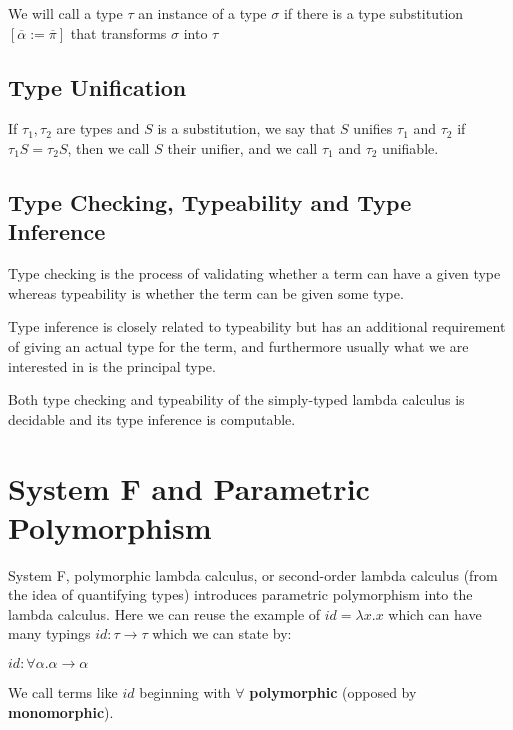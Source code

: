 We will call a type $\tau$ an instance of a type $\sigma$ if there is a type substitution $[\overline{\alpha} := \overline{\pi}]$
that transforms $\sigma$ into $\tau$ %

\subsection{Type Unification}

If $\tau_1, \tau_2$ are types and $S$ is a substitution, we say that $S$ unifies
$\tau_1$ and $\tau_2$ if $\tau_1 S = \tau_2 S$, then we call $S$ their unifier, and we call $\tau_1$ and $\tau_2$ unifiable. %


\subsection{Type Checking, Typeability and Type Inference}

Type checking is the process of validating whether a term can have a given type
whereas typeability is whether the term can be given some type.

Type inference is closely related to typeability but has an additional requirement of giving an actual type for the term, and furthermore
usually what we are interested in is the principal type.

Both type checking and typeability of the simply-typed lambda calculus is decidable and its type inference is computable. %

\section{System F and Parametric Polymorphism} %

System F, polymorphic lambda calculus, or second-order lambda calculus (from the idea of quantifying types) introduces
parametric polymorphism into the lambda calculus. Here we can reuse the example of $id = \lambda x . x$ which can have many typings
$id : \tau \rightarrow \tau$ which we can state by:

$id : \forall \alpha . \alpha \rightarrow \alpha$

We call terms like $id$ beginning with $\forall$ \textbf{polymorphic} (opposed by \textbf{monomorphic}).

